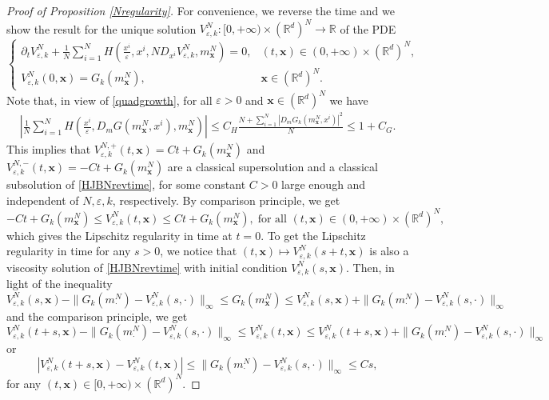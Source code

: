 \documentclass[reqno,11pt]{amsart}
\numberwithin{equation}{section}
\newcommand{\be}{\begin{equation}}
\newcommand{\ee}{\end{equation}}
\newcommand{\R}{\mathbb{R}} %
\newcommand{\e}{\varepsilon}
\newcommand{\nd}{\noindent}
\begin{document}
\begin{proof}[Proof of Proposition \ref{Nregularity}]
\nd
For convenience, we reverse the time and we show the result for the unique solution $V_{\e,k}^N\colon [0,+\infty)\times (\R^d)^N\to \R$ of the PDE
\be\label{HJBNrevtime}
\begin{cases}
    \partial_tV^N_{\e,k}+\frac{1}{N}\sum_{i=1}^NH(\frac{x^i}{\e},x^i,ND_{x^i}V^N_{\e,k},m_{\bm x}^N)=0, &(t,\bm x)\in (0,+\infty)\times (\R^d)^N,\\
    V^N_{\e,k}(0,\bm x)= G_k(m_{\bm x}^N), & \bm x\in (\R^d)^N.
\end{cases}
\ee
Note that, in view of \eqref{quadgrowth}, for all $\e>0$ and $\bm x\in (\R^d)^N$ we have
\begin{align}
    \left|\frac{1}{N}\sum_{i=1}^NH\left(\frac{x^i}{\e},D_mG(m^N_{\bm x},x^i),m_{\bm x}^N\right)\right|\le C_H\frac{N+\sum_{i=1}^N\left|D_mG_k(m^N_{\bm x},x^i)\right|^2}{N}\le 1+C_G.
\end{align}
This implies that $V^{N,+}_{\e,k}(t,\bm x)=Ct+G_k(m^N_{\bm x})$ and $V^{N,-}_{\e,k}(t,\bm x)=-Ct+G_k(m^N_{\bm x})$ are a classical supersolution and a classical subsolution of \eqref{HJBNrevtime}, for some constant $C>0$ large enough and independent of $N,\e,k$, respectively. By comparison principle, we get
$$-Ct+G_k(m^N_{\bm x})\le V^N_{\e,k}(t,\bm x)\le Ct+G_k(m^N_{\bm x}),\;\text{for all }(t,\bm x)\in (0,+\infty)\times (\R^d)^N,$$
which gives the Lipschitz regularity in time at $t=0$. To get the Lipschitz regularity in time for any $s>0$, we notice that $(t,\bm x)\mapsto V^N_{\e,k}(s+t,\bm x)$ is also a viscosity solution of \eqref{HJBNrevtime} with initial condition $V^{N}_{\e,k}(s,\bm x)$. Then, in light of the inequality
$$V^N_{\e,k}(s,\bm x)-\|G_k(m^N_{\cdot})-V^N_{\e,k}(s,\cdot)\|_{\infty}\le G_k(m^N_{\bm x})\le V^N_{\e,k}(s,\bm x)+\|G_k(m^N_{\cdot})-V^N_{\e,k}(s,\cdot)\|_{\infty}$$
and the comparison principle, we get
$$V^N_{\e,k}(t+s,\bm x)-\|G_k(m^N_{\cdot})-V^N_{\e,k}(s,\cdot)\|_{\infty}\le V^N_{\e,k}(t,\bm x)\le V^N_{\e,k}(t+s,\bm x)+\|G_k(m^N_{\cdot})-V^N_{\e,k}(s,\cdot)\|_{\infty}$$
or
$$\left|V^N_{\e,k}(t+s,\bm x)- V^N_{\e,k}(t,\bm x)   \right|\le \|G_k(m^N_{\cdot})-V^N_{\e,k}(s,\cdot)\|_{\infty}\le Cs,$$
for any $(t,\bm x)\in [0,+\infty)\times (\R^d)^N$.
\vspace{2mm}


\end{proof}
\end{document}
